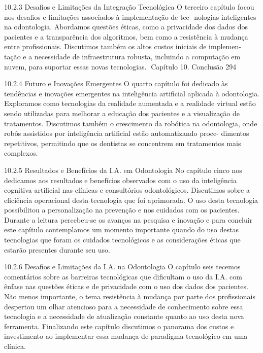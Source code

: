 10.2.3    Desafios e Limitações da Integração Tecnológica
O terceiro capítulo focou nos desafios e limitações associados à implementação de tec-
nologias inteligentes na odontologia. Abordamos questões éticas, como a privacidade
dos dados dos pacientes e a transparência dos algoritmos, bem como a resistência à
mudança entre profissionais. Discutimos também os altos custos iniciais de implemen-
tação e a necessidade de infraestrutura robusta, incluindo a computação em nuvem,
para suportar essas novas tecnologias.
Capítulo 10. Conclusão                                                                294


10.2.4     Futuro e Inovações Emergentes
O quarto capítulo foi dedicado às tendências e inovações emergentes na inteligência
artificial aplicada à odontologia. Exploramos como tecnologias da realidade aumentada
e a realidade virtual estão sendo utilizadas para melhorar a educação dos pacientes
e a visualização de tratamentos. Discutimos também o crescimento da robótica na
odontologia, onde robôs assistidos por inteligência artificial estão automatizando proce-
dimentos repetitivos, permitindo que os dentistas se concentrem em tratamentos mais
complexos.

10.2.5     Resultados e Benefícios da I.A. em Odontologia
No capítulo cinco nos dedicamos aos resultados e benefícios observados com o uso
da inteligência cognitiva artificial nas clínicas e consultórios odontológicos. Discutimos
sobre a eficiência operacional desta tecnologia que foi aprimorada. O uso desta
tecnologia possibilitou a personalização na prevenção e nos cuidados com os pacientes.
Durante a leitura percebeu-se os avanços na pesquisa e inovação e para concluir este
capítulo contemplamos um momento importante quando do uso destas tecnologias
que foram os cuidados tecnológicos e as considerações éticas que estarão presentes
durante seu uso.

10.2.6     Desafios e Limitações da I.A. na Odontologia
O capítulo seis tecemos comentários sobre as barreiras tecnológicas que dificultam
o uso da I.A. com ênfase nas questões éticas e de privacidade com o uso dos dados
dos pacientes. Não menos importante, o tema resistência à mudança por parte dos
profissionais despertou um olhar atencioso para a necessidade de conhecimento sobre
essa tecnologia e a necessidade de atualização constante quanto ao uso desta nova
ferramenta. Finalizando este capítulo discutimos o panorama dos custos e investimento
ao implementar essa mudança de paradigma tecnológico em uma clínica.

